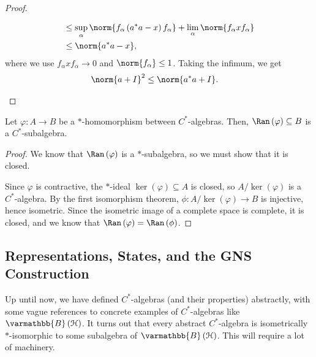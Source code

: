 \documentclass[10pt]{mypackage}
\renewcommand*{\mathbb}[1]{\varmathbb{#1}}
\newcommand{\B}{\mathbb{B}}
\begin{document}
\begin{proof}
\begin{enumerate}[(1)]
\begin{align*}
                     &\leq \sup_{\alpha}\norm{f_{\alpha}\left(a^{\ast}a-x\right)f_{\alpha}} + \lim_{\alpha}\norm{f_{\alpha}xf_{\alpha}}\\
                     &\leq \norm{a^{\ast}a-x},
      \end{align*}
      where we use $f_{\alpha}xf_{\alpha}\rightarrow 0$ and $\norm{f_{\alpha}}\leq 1$. Taking the infimum, we get
      \begin{align*}
        \norm{a+I}^2 &\leq \norm{a^{\ast}a + I}.
      \end{align*}
  \end{enumerate}
\end{proof}
\begin{corollary}
  Let $\varphi\colon A\rightarrow B$ be a $\ast$-homomorphism between $C^{\ast}$-algebras. Then, $\Ran\left(\varphi\right)\subseteq B$ is a $C^{\ast}$-subalgebra.
\end{corollary}
\begin{proof}
  We know that $\Ran\left(\varphi\right)$ is a $\ast$-subalgebra, so we must show that it is closed.\newline

  Since $\varphi$ is contractive, the $\ast$-ideal $\ker\left(\varphi\right)\subseteq A$ is closed, so $A/\ker\left(\varphi\right)$ is a $C^{\ast}$-algebra. By the first isomorphism theorem, $\phi\colon A/ \ker\left(\varphi\right)\rightarrow B$ is injective, hence isometric. Since the isometric image of a complete space is complete, it is closed, and we know that $\Ran\left(\varphi\right) = \Ran\left(\phi\right)$.
\end{proof}
\subsection{Representations, States, and the GNS Construction}%
Up until now, we have defined $C^{\ast}$-algebras (and their properties) abstractly, with some vague references to concrete examples of $C^{\ast}$-algebras like $\B\left(\mathcal{H}\right)$. It turns out that every abstract $C^{\ast}$-algebra is isometrically $\ast$-isomorphic to some subalgebra of $\B\left(\mathcal{H}\right)$. This will require a lot of machinery.\newline
\end{document}
